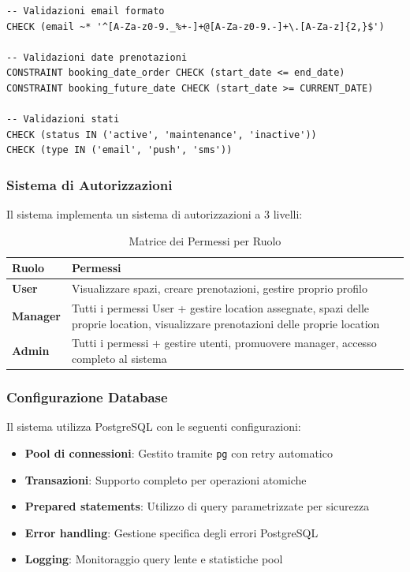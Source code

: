 \begin{lstlisting}[caption=Constraint Database Implementati]
-- Validazioni email formato
CHECK (email ~* '^[A-Za-z0-9._%+-]+@[A-Za-z0-9.-]+\.[A-Za-z]{2,}$')

-- Validazioni date prenotazioni
CONSTRAINT booking_date_order CHECK (start_date <= end_date)
CONSTRAINT booking_future_date CHECK (start_date >= CURRENT_DATE)

-- Validazioni stati
CHECK (status IN ('active', 'maintenance', 'inactive'))
CHECK (type IN ('email', 'push', 'sms'))
\end{lstlisting}

\subsubsection{Sistema di Autorizzazioni}
Il sistema implementa un sistema di autorizzazioni a 3 livelli:

\begin{table}[H]
\centering
\begin{tabular}{@{}lp{10cm}@{}}
\toprule
\textbf{Ruolo} & \textbf{Permessi} \\
\midrule
\textbf{User} & Visualizzare spazi, creare prenotazioni, gestire proprio profilo \\
\textbf{Manager} & Tutti i permessi User + gestire location assegnate, spazi delle proprie location, visualizzare prenotazioni delle proprie location \\
\textbf{Admin} & Tutti i permessi + gestire utenti, promuovere manager, accesso completo al sistema \\
\bottomrule
\end{tabular}
\caption{Matrice dei Permessi per Ruolo}
\end{table}

\subsubsection{Configurazione Database}
Il sistema utilizza PostgreSQL con le seguenti configurazioni:

\begin{itemize}
    \item \textbf{Pool di connessioni}: Gestito tramite \texttt{pg} con retry automatico
    \item \textbf{Transazioni}: Supporto completo per operazioni atomiche
    \item \textbf{Prepared statements}: Utilizzo di query parametrizzate per sicurezza
    \item \textbf{Error handling}: Gestione specifica degli errori PostgreSQL
    \item \textbf{Logging}: Monitoraggio query lente e statistiche pool
\end{itemize}